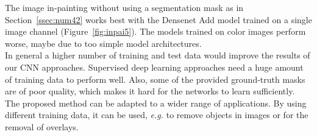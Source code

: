 The image in-painting without using a segmentation mask as in Section~\ref{ssec:num42} works best with the Densenet Add model trained on a single image channel (Figure~\ref{fig:inpai5}). The models trained on color images perform worse, maybe due to too simple model architectures.\\ 

In general a higher number of training and test data would improve the results of our CNN approaches. Supervised deep learning approaches need a huge amount of training data to perform well. Also, some of the provided ground-truth masks are of poor quality, which makes it hard for the networks to learn sufficiently. \\

The proposed method can be adapted to a wider range of applications. By using different training data, it can be used, \textit{e.g.} to remove objects in images or for the removal of overlays.



\newpage
\label{sect:bib}






